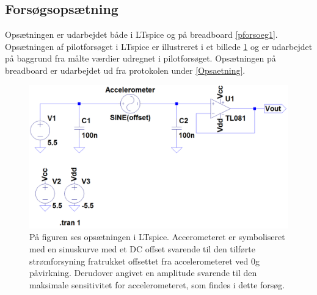 \subsection{Forsøgsopsætning}
Opsætningen er udarbejdet både i LTspice og på breadboard \ref{pforsoeg1}. Opsætningen af pilotforsøget i LTspice  er illustreret i et billede \ref{pLTspice} og er udarbejdet på baggrund fra målte værdier udregnet i pilotforsøget. Opsætningen på breadboard er udarbejdet ud fra protokolen under \ref{Opsaetning}.  

\begin{figure}[H]
		\centering
		\includegraphics[scale=0.4]{figures/Bilag/Test_opsaetning.PNG}
		\caption{På figuren ses opsætningen i LTspice. Accerometeret er symboliseret med en sinuskurve med et DC offset svarende til den tilførte strømforsyning fratrukket offsettet fra accelerometeret ved $0$g påvirkning. Derudover angivet en amplitude svarende til den maksimale sensitivitet for accelerometeret, som findes i dette forsøg.}
		\label{pLTspice}
\end{figure}


